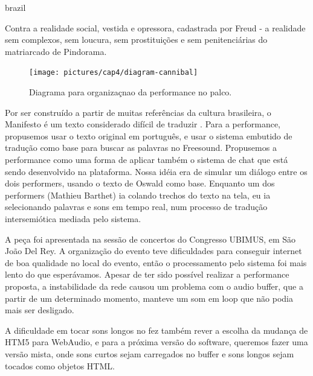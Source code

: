 \begin{otherlanguage*}{brazil}
\begin{citacao}
Contra a realidade social, vestida e opressora, cadastrada por Freud - a realidade sem complexos, sem loucura, sem prostituições e sem penitenciárias do matriarcado de Pindorama. \cite{Andrade1928}
\end{citacao}

\begin{figure}[hb!]
\centering
\texttt{[image: pictures/cap4/diagram-cannibal]}
\caption{Diagrama para organizaçnao da performance no palco.}
\label{diagram}
\end{figure}

Por ser construído a partir de muitas referências da cultura brasileira, o Manifesto é um texto considerado difícil de traduzir \cite{Lesli-1991}. Para a performance, propusemos usar o texto original em português, e usar o sistema embutido de tradução como base para buscar as palavras no Freesound. Propusemos a performance como uma forma de aplicar também o sistema de chat que está sendo desenvolvido na plataforma. Nossa idéia era de simular um diálogo entre os dois performers, usando o texto de Oswald como base. Enquanto um dos performers (Mathieu Barthet) ia colando trechos do texto na tela, eu ia selecionando palavras e sons em tempo real, num processo de tradução intersemiótica \cite{JulioPlaza1969} mediada pelo sistema. 

A peça foi apresentada na sessão de concertos do Congresso UBIMUS, em São João Del Rey. A organização do evento teve dificuldades para conseguir internet de boa qualidade no local do evento, então o processamento pelo sistema foi mais lento do que esperávamos. Apesar de ter sido possível realizar a performance proposta, a instabilidade da rede causou um problema com o audio buffer, que a partir de um determinado momento, manteve um som em loop que não podia mais ser desligado.

A dificuldade em tocar sons longos no fez também rever a escolha da mudança de HTM5 para WebAudio, e para a próxima versão do software, queremos fazer uma versão mista, onde sons curtos sejam carregados no buffer e sons longos sejam tocados como objetos HTML.



\end{otherlanguage*}
